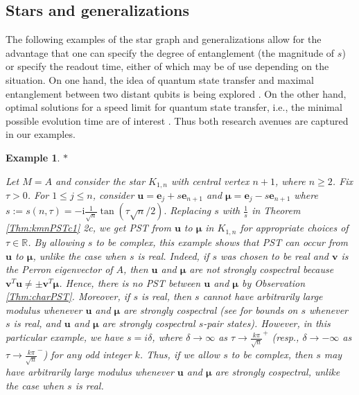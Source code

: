 \documentclass{article}
\numberwithin{equation}{section}
\newtheorem{ex}[lemma]{Example}
\newcommand{\be}{\mathbf e}
\newcommand{\bu}{\mathbf u}
\newcommand{\bv}{\mathbf v}
\newcommand{\bmu}{{\boldsymbol{\mu}}}
\def\R{\mathbb{R}}
\def\ii{\mathrm{i}}
\begin{document}
{\subsection{Stars and generalizations}

The following examples of the star graph and generalizations allow for the advantage that one can specify the degree of entanglement (the magnitude of $s$) or specify the readout time, either of which may be of use depending on the situation. On one hand, the idea of quantum state transfer and maximal entanglement between two distant qubits is being explored \cite{ghosh2025quantum, aiyejina2023perfect}. On the other hand, optimal solutions for a speed limit for quantum state transfer, i.e.,  the minimal possible evolution time are of interest \cite{yung2006quantum, kay2010perfect}. Thus both research avenues are captured in our examples. 

\begin{ex}\label{eg:star}$*$ \rm{
Let $M=A$ and consider the star $K_{1,n}$ with central vertex $n+1$, where $n\geq 2$. Fix $\tau>0$. For $1\leq j\leq n$, consider $\bu=\be_j+s\be_{n+1}$ and $\bmu=\be_j-s\be_{n+1}$ where $s:=s(n,\tau)=-\ii \frac{1}{\sqrt{n}}\tan \left(\tau \sqrt{n}/2 \right).$
Replacing $s$ with $\frac{1}{s}$ in Theorem \ref{Thm:kmnPSTc1} 2c, we get PST from $\bu$ to $\bmu$ in $K_{1,n}$ for appropriate choices of $\tau\in\R$. By allowing $s$ to be complex, this example shows that PST can occur from $\bu$ to $\bmu$, unlike the case when $s$ is real. Indeed, if $s$ was chosen to be real and $\bv$ is the Perron eigenvector of $A$, then $\bu$ and $\bmu$ are not strongly cospectral because $\bv^T\bu\neq \pm \bv^T\bmu$. Hence, there is no PST between $\bu$ and $\bmu$ by Observation \ref{Thm:charPST}. Moreover, if $s$ is real, then $s$ cannot have arbitrarily large modulus whenever $\bu$ and $\bmu$ are strongly cospectral (see \cite[Corollary 9.3.3]{monterde2025quantum} for bounds on $s$ whenever $s$ is real, and $\bu$ and $\bmu$ are strongly cospectral $s$-pair states). However, in this particular example, we have $s=i \delta$, where $\delta \rightarrow\infty$ as $\tau\rightarrow\frac{k\pi}{\sqrt{n}}^+$ (resp., $\delta \rightarrow-\infty$ as $\tau\rightarrow\frac{k\pi}{\sqrt{n}}^-$) for any odd integer $k$. Thus, if we allow $s$ to be complex, then $s$ may have arbitrarily large modulus whenever $\bu$ and $\bmu$ are strongly cospectral, unlike the case when $s$ is real.

}
\end{ex}}
\end{document}
